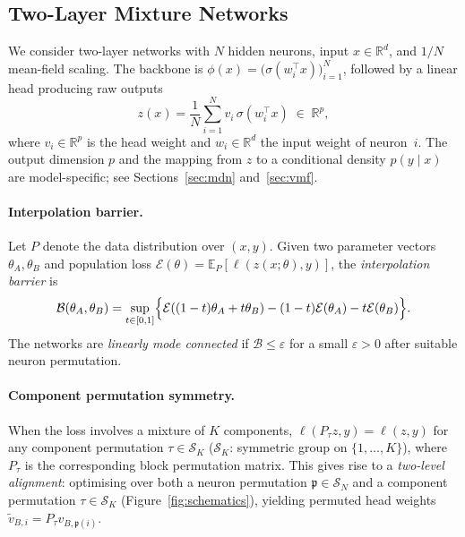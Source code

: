 \documentclass[11pt]{article}
\newcommand{\R}{\mathbb{R}}
\newcommand{\E}{\mathbb{E}}
\newcommand{\cS}{\mathcal{S}}
\newcommand{\cB}{\mathcal{B}}
\newcommand{\cE}{\mathcal{E}}
\newcommand{\nperm}{\mathfrak{p}}  %
\begin{document}
\subsection{Two-Layer Mixture Networks}\label{sec:general_arch}

We consider two-layer networks with $N$ hidden neurons, input
$x \in \R^d$, and $1/N$ mean-field scaling.
The backbone is
$\phi(x) = \bigl(\sigma(w_i^\top x)\bigr)_{i=1}^N$,
followed by a linear head producing raw outputs
\begin{equation}\label{eq:network_output}
  z(x) = \frac{1}{N}\sum_{i=1}^N v_i\,\sigma(w_i^\top x)
  \;\in\; \R^p,
\end{equation}
where $v_i \in \R^p$ is the head weight and
$w_i \in \R^d$ the input weight of neuron~$i$.
The output dimension $p$ and the mapping from $z$ to a conditional
density $p(y \mid x)$ are model-specific; see
Sections~\ref{sec:mdn} and~\ref{sec:vmf}.

\paragraph{Interpolation barrier.}
Let $P$ denote the data distribution over $(x,y)$.
Given two parameter vectors $\theta_A,\theta_B$ and population loss
$\cE(\theta)=\E_P[\ell(z(x;\theta),y)]$, the
\emph{interpolation barrier} is
\[
  \cB(\theta_A,\theta_B)
  = \sup_{t\in[0,1]}\Bigl\{
    \cE((1-t)\theta_A + t\theta_B)
    - (1-t)\cE(\theta_A) - t\cE(\theta_B)
  \Bigr\}.
\]
The networks are \emph{linearly mode connected} if
$\cB \le \varepsilon$ for a small $\varepsilon > 0$ after suitable
neuron permutation.

\paragraph{Component permutation symmetry.}
When the loss involves a mixture of $K$ components,
$\ell(P_\tau z, y) = \ell(z, y)$ for any component
permutation $\tau \in \cS_K$
($\cS_K$: symmetric group on $\{1,\dots,K\}$),
where $P_\tau$ is the corresponding block permutation matrix.
This gives rise to a \emph{two-level alignment}: optimising over
both a neuron permutation $\nperm \in \cS_N$ and a component
permutation $\tau \in \cS_K$
(Figure~\ref{fig:schematics}), yielding permuted head weights
$\widetilde{v}_{B,i} = P_\tau v_{B,\nperm(i)}$.
\end{document}
